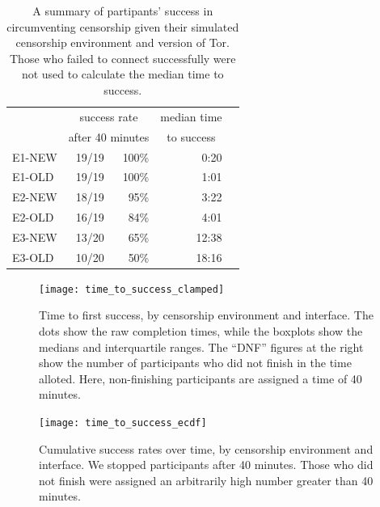 \documentclass[USenglish,oneside,twocolumn]{article}
\begin{document}
\begin{table}
\centering
	\begin{tabular}{l r r r r}
	& \multicolumn{2}{c}{success rate} & \multicolumn{1}{c}{median time} \\
	& \multicolumn{2}{c}{after 40 minutes} & \multicolumn{1}{c}{to success} \\
	\noalign{\hrule}
	E1-NEW & 19/19 & 100\% & 0:20 \\
	E1-OLD & 19/19 & 100\% & 1:01 \\
	E2-NEW & 18/19 & 95\% & 3:22 \\
	E2-OLD & 16/19 & 84\% & 4:01 \\
	E3-NEW & 13/20 & 65\% & 12:38 \\
	E3-OLD & 10/20 & 50\% & 18:16 \\
	\end{tabular}
\caption{A summary of partipants' success in circumventing censorship
given their simulated censorship environment and version of Tor. Those who
failed to connect successfully were not used to calculate the median time
to success.}
\end{table}


\begin{figure}
\centering
\texttt{[image: time\_to\_success\_clamped]}
\caption{
Time to first success, by censorship environment and interface.
The dots show the raw completion times,
while the boxplots show the medians and interquartile ranges.
The ``DNF'' figures at the right show the number of participants 
who did not finish in the time alloted.
Here, non-finishing participants are assigned a time of 40 minutes.
}
\label{fig:time_to_success_clamped}
\end{figure}

\begin{figure}
\centering
\texttt{[image: time\_to\_success\_ecdf]}
\caption{
Cumulative success rates over time, by censorship environment and interface.
We stopped participants after 40 minutes. Those who did not finish were assigned
an arbitrarily high number greater than 40 minutes. 
}
\label{fig:time_to_success_ecdf}
\end{figure}
\end{document}
